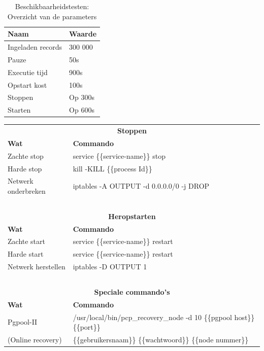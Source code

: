 \begin{table}[ht!]
	\centering
	\begin{tabular}{l| l }
		\textbf{Naam} & \textbf{Waarde}  \\
		\hline
		Ingeladen records  & 300 000 \\
		Pauze & 50s \\
		Executie tijd & 900s \\
		Opstart kost & 100s \\
		Stoppen & Op 300s \\
		Starten & Op 600s \\
	\end{tabular}
	\caption{Beschikbaarheidstesten: Overzicht van de parameters}
	\label{table:beschikbaarheidstesten-parameters}
\end{table}
\begin{table}[htb!]
	\centering
		\begin{tabular}{l|l}
			\multicolumn{2}{c}{\textbf{Stoppen}} \\
			\textbf{Wat} & \textbf{Commando} \\ 
			\hline
			Zachte stop & service \{\{service-name\}\} stop \\ 
			Harde stop & kill -KILL \{\{process Id\}\} \\ 
			Netwerk onderbreken & iptables -A OUTPUT -d 0.0.0.0/0 -j DROP  \\ 
			\multicolumn{2}{c}{~} \\
			\multicolumn{2}{c}{\textbf{Heropstarten}} \\
			\textbf{Wat} & \textbf{Commando} \\ 
			\hline
			Zachte start & service \{\{service-name\}\} restart \\ 
			Harde start & service \{\{service-name\}\} restart \\ 
			Netwerk herstellen & iptables -D OUTPUT 1  \\ 
			\multicolumn{2}{c}{~}  \\
			\multicolumn{2}{c}{\textbf{Speciale commando's}} \\
			\textbf{Wat} & \textbf{Commando} \\ 
			\hline
			Pgpool-II & /usr/local/bin/pcp\_recovery\_node -d 10 \{\{pgpool host\}\} \{\{port\}\} \\
			\hspace*{0.5cm} (Online recovery) &  \hspace*{0.5cm} \{\{gebruikersnaam\}\} \{\{wachtwoord\}\}  \{\{node nummer\}\} \\
		\end{tabular} 
	\label{table:beschikbaarheidstesten-commandos}
\end{table}

